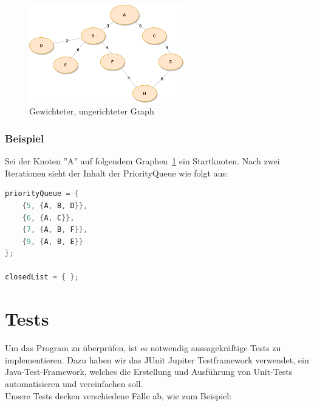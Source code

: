 \documentclass[a4paper]{article}
\begin{document}
\begin{figure}[htbp]
	\centering
		\includegraphics[width=0.60\textwidth]{Figs/Beispielgraph_2.png}		
	\caption{Gewichteter, ungerichteter Graph}
	\label{fig:beispielgraph_2}
\end{figure}

\subsubsection{Beispiel}

Sei der Knoten ''A'' auf folgendem Graphen~\ref{fig:beispielgraph_2} ein Startknoten.
Nach zwei Iterationen sieht der Inhalt der PriorityQueue wie folgt aus:\\

\begin{lstlisting}[language = java, frame = trBL]
priorityQueue = {
    {5, {A, B, D}},
    {6, {A, C}},
    {7, {A, B, F}},
    {9, {A, B, E}}
};

closedList = { };
\end{lstlisting}

\newpage

\section{Tests}

Um das Program zu überprüfen, ist es notwendig aussagekräftige Tests zu implementieren. Dazu haben wir das JUnit Jupiter Testframework verwendet, ein Java-Test-Framework, welches die Erstellung und Ausführung von Unit-Tests automatisieren und vereinfachen soll.\\

Unsere Tests decken verschiedene Fälle ab, wie zum Beispiel:
\end{document}
